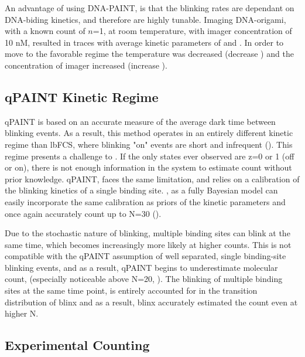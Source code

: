 An advantage of using DNA-PAINT, is that the blinking rates are dependant on DNA-biding kinetics,
	and therefore are highly tunable. %
	Imaging DNA-origami, with a known count of $n$=1, at room temperature, with imager concentration of 10 nM, 
	resulted in traces with average kinetic parameters of  and  . 
	In order to move to the favorable regime the temperature was decreased (decrease \poff) 
	and the concentration of imager increased (increase \pon).



\subsection{qPAINT Kinetic Regime}
qPAINT is based on an accurate measure of the average dark time between blinking events. 
	As a result, this method operates in an entirely different kinetic regime than lbFCS, where blinking 
	"on" events are short and infrequent ().
	This regime presents a challenge to \ours. If the only states ever observed are z=0 or 1 (off or on),
	there is not enough information in the system to estimate count without prior knowledge.
	qPAINT, faces the same limitation, and relies on a calibration of the blinking kinetics of a single binding site.
	\ours, as a fully Bayesian model can easily incorporate the same calibration as priors of the kinetic parameters
	and once again accurately count up to N=30 ().

Due to the stochastic nature of blinking, multiple binding sites can blink at the same time, 
	which becomes increasingly more likely at higher counts.
	This is not compatible with the qPAINT assumption of well separated, single binding-site blinking events, 
	and as a result, qPAINT begins to underestimate molecular count, (especially noticeable above N=20, ). 
	The blinking of multiple binding sites at the same time point, 
	is entirely accounted for in the transition distribution of blinx 
	and as a result, blinx accurately estimated the count even at higher N.
	




\subsection{Experimental Counting}
